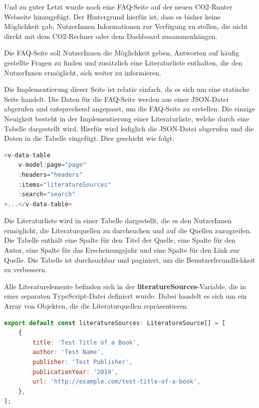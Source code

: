 Und zu guter Letzt wurde noch eine FAQ-Seite auf der neuen CO2-Runter Webseite hinzugefügt. Der Hintergrund hierfür ist, dass es bisher keine Möglichkeit gab, NutzerInnen Informationen zur Verfügung zu stellen, die nicht direkt mit dem CO2-Rechner oder dem Dashboard zusammenhängen.

Die FAQ-Seite soll NutzerInnen die Möglichkeit geben, Antworten auf häufig gestellte Fragen zu finden und zusätzlich eine Literaturliste enthalten, die den NutzerInnen ermöglicht, sich weiter zu informieren.

Die Implementierung dieser Seite ist relativ einfach, da es sich um eine statische Seite handelt. Die Daten für die FAQ-Seite werden aus einer \acs{JSON}-Datei abgerufen und entsprechend angepasst, um die FAQ-Seite zu erstellen. Die einzige Neuigkeit besteht in der Implementierung einer Literaturliste, welche durch eine Tabelle dargestellt wird. Hierfür wird lediglich die \acs{JSON}-Datei abgerufen und die Daten in die Tabelle eingefügt. Dies geschieht wie folgt:

\begin{lstlisting}[language={JavaScript}, caption={Laden der Literaturliste}]
<v-data-table
    v-model:page="page"
    :headers="headers"
    :items="literatureSources"
    :search="search"
>...</v-data-table>
\end{lstlisting}

Die Literaturliste wird in einer Tabelle dargestellt, die es den NutzerInnen ermöglicht, die Literaturquellen zu durchsuchen und auf die Quellen zuzugreifen. Die Tabelle enthält eine Spalte für den Titel der Quelle, eine Spalte für den Autor, eine Spalte für das Erscheinungsjahr und eine Spalte für den Link zur Quelle. Die Tabelle ist durchsuchbar und paginiert, um die Benutzerfreundlichkeit zu verbessern.

Alle Literaturelemente befinden sich in der \textbf{literatureSources}-Variable, die in einer separaten TypeScript-Datei definiert wurde. Dabei handelt es sich um ein Array von Objekten, die die Literaturquellen repräsentieren.

\begin{lstlisting}[language={JavaScript}, caption={Literaturelemente}]
export default const literatureSources: LiteratureSource[] = [
    {
        title: 'Test Title of a Book',
        author: 'Test Name',
        publisher: 'Test Publisher',
        publicationYear: '2019',
        url: 'http://example.com/test-title-of-a-book',
    },
];
\end{lstlisting}

